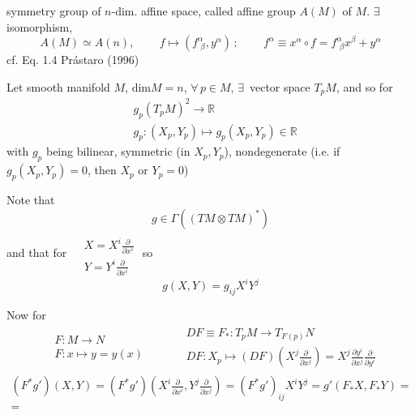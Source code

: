 \begin{theorem}[1.5] symmetry group of $n$-dim. affine space, called affine group $A(M)$ of $M$.  $\exists \, $ isomorphism,
  \begin{equation}
    A(M) \simeq A(n), \qquad \, f\mapsto (f^{\alpha}_{ \, \, \beta} , y^{\alpha}) \, ; \qquad \, f^{\alpha} \equiv x^{\alpha} \circ f = f^{\alpha}_{ \, \, \beta} x^{\beta} + y^{\alpha}
  \end{equation}
cf. Eq. 1.4 Pr\'{a}staro (1996) \cite{dgdt:Pras1996}
  \end{theorem}

\begin{definition}[metric]
	Let smooth manifold $M$, $\text{dim}M = n$, $\forall \, p \in M$, $\exists \, $ vector space $T_pM$, and so for 
	\begin{equation}
	\begin{aligned}
	& g_p (T_pM)^2 \to \mathbb{R} \\
	& g_p : (X_p,Y_p) \mapsto g_p(X_p,Y_p) \in \mathbb{R}
	\end{aligned}
	\end{equation}
	with $g_p$ being bilinear, symmetric (in $X_p,Y_p$), nondegenerate (i.e. if $g_p(X_p,Y_p)=0$, then $X_p$ or $Y_p=0$)
	
	Note that 
	\[
	g\in \Gamma((TM \otimes TM)^*)
	\]
	and that for $\begin{aligned} & \quad \\ 
	& X = X^i \frac{ \partial }{ \partial x^i } \\
	& Y = Y^i \frac{ \partial }{ \partial x^i } \end{aligned}$  
	so 	
	\[
	g(X,Y) = g_{ij} X^i Y^j
	\]  
	
\end{definition}

Now for 
\[
\begin{gathered}
\begin{aligned} 
& F: M \to N \\
& F: x \mapsto y = y(x) 
\end{aligned} \qquad \, \begin{aligned}
& DF \equiv F_* : T_p M \to T_{F(p)}N \\ 
&  DF : X_p \mapsto (DF) (X^j \frac{ \partial }{ \partial x^j }) = X^j \frac{\partial y^i}{\partial x^j} \frac{ \partial }{ \partial y^i}
\end{aligned}
\end{gathered}
\]
\[
\begin{gathered}
(F^* g')(X,Y) = (F^*g')(X^i \frac{ \partial }{ \partial x^i } , Y^j \frac{ \partial }{ \partial x^j} ) = (F^*g')_{ij} X^i Y^j = g'(F_*X, F_*Y) = \\
= 
\end{gathered}
\]

